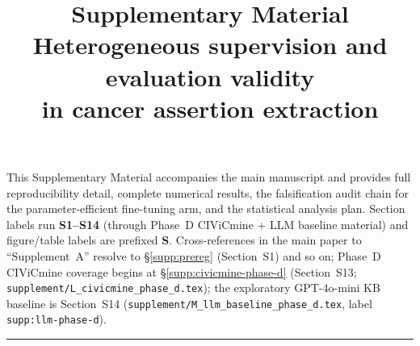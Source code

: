\documentclass[11pt]{article}
\title{Supplementary Material \\
       \large Heterogeneous supervision and evaluation validity \\
              in cancer assertion extraction}
\date{}
\begin{document}
\maketitle
\thispagestyle{plain}

\begin{center}
\small
This Supplementary Material accompanies the main manuscript and
provides full reproducibility detail, complete numerical results, the
falsification audit chain for the parameter-efficient fine-tuning
arm, and the statistical analysis plan. Section labels run
\textbf{S1--S14} (through Phase~D CIViCmine + LLM baseline material) and figure/table labels are
prefixed \textbf{S}.
Cross-references in the main paper to ``Supplement~A'' resolve to
\S\ref{supp:prereg} (Section~S1) and so on; Phase~D CIViCmine coverage begins at
\S\ref{supp:civicmine-phase-d} (Section~S13; \texttt{supplement/L\_civicmine\_phase\_d.tex}); the exploratory GPT-4o-mini KB baseline is Section~S14
(\texttt{supplement/M\_llm\_baseline\_phase\_d.tex}, label \texttt{supp:llm-phase-d}).
\end{center}

\vspace{1em}
\tableofcontents
\vspace{1em}
\hrule
\vspace{1.5em}

















\end{document}
